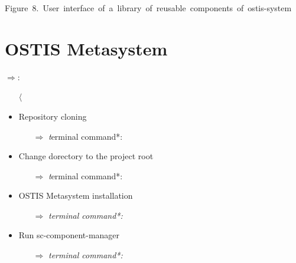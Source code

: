 \documentclass[twocolumn]{article}
\begin{document}
\noindent
 \hspace{2cm}\mbox{Figure 8. User interface of a library of reusable components of ostis-system
}

\clearpage









\renewcommand{\baselinestretch}{0.9}
\section*{\large OSTIS Metasystem}
$\Rightarrow $: \hfill\break 
\begin{itemize}
\item[$\langle$]\item   {Repository cloning} 
    \begin{itemize}
\item[$\Rightarrow $] \textit terminal command*: \hfill{}
 \end{itemize}   
 \end{itemize}       

\begin{itemize}
\item{Change dorectory to the project root} 
    \begin{itemize}
\item[$\Rightarrow $] \textit terminal command*: \hfill{}
\end{itemize}   
\end{itemize}   

\begin{itemize}
\item{OSTIS Metasystem installation} 
    \begin{itemize}
\item[$\Rightarrow $]\textit {terminal command*:} \hfill{}
\end{itemize}   
\end{itemize}   


\begin{itemize}
\item{Run sc-component-manager} 
    \begin{itemize}
\item[$\Rightarrow $]\textit {terminal command*:} \hfill{}
\end{itemize}   
\end{itemize}   
\end{document}

